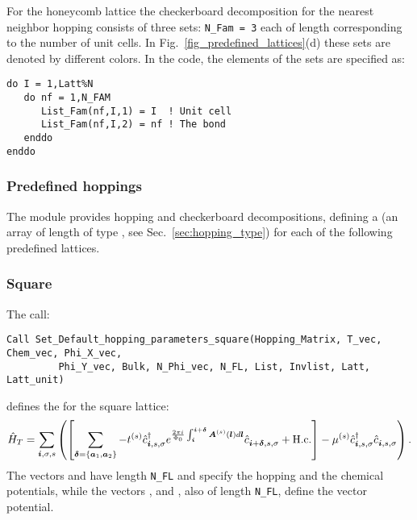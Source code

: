 For the honeycomb lattice  the checkerboard decomposition  for the nearest neighbor hopping consists of three  sets:  \texttt{N\_Fam = 3}  each of length   corresponding  to the number of unit cells.  In  Fig.~\ref{fig_predefined_lattices}(d)  
these sets are denoted by different colors. In the code, the elements of the sets are specified as:

\begin{lstlisting}[style=fortran] 
do I = 1,Latt%N
   do nf = 1,N_FAM
      List_Fam(nf,I,1) = I  ! Unit cell
      List_Fam(nf,I,2) = nf ! The bond 
   enddo
enddo
\end{lstlisting}        


\subsubsection{Predefined hoppings}

The  module provides hopping and checkerboard decompositions, defining a   (an array of length  of type  , see Sec.~\ref{sec:hopping_type}) for each of the following predefined lattices.

\subsubsection*{Square}
The call:
\begin{lstlisting}[style=fortran]
Call Set_Default_hopping_parameters_square(Hopping_Matrix, T_vec, Chem_vec, Phi_X_vec,  
         Phi_Y_vec, Bulk, N_Phi_vec, N_FL, List, Invlist, Latt, Latt_unit)
\end{lstlisting}
defines  the   for the square  lattice: 
\begin{equation}
\hat{H}_T  =   \sum_{\boldsymbol{i}, \sigma, s}  \left( \left[ \sum_{ \boldsymbol{\delta} = \left\{ \boldsymbol{a}_1, \boldsymbol{a}_2\right\} }    - t^{(s)} \hat{c}^{\dagger}_{\boldsymbol{i},s,\sigma}   e^{\frac{2 \pi i}{\Phi_0} \int_{\boldsymbol{i}}^{\boldsymbol{i}+ \boldsymbol{\delta}}  \boldsymbol{A}^{(s)}(\boldsymbol{l})  d \boldsymbol{l}}   \hat{c}^{}_{\boldsymbol{i} + \boldsymbol{\delta},s,\sigma} +  \mathrm{H.c.}   \right]    -  \mu^{(s)} \hat{c}^{\dagger}_{\boldsymbol{i},s,\sigma} \hat{c}^{}_{\boldsymbol{i},s,\sigma}  \right).
\end{equation}
The vectors   and  have  length \texttt{N\_FL} and specify the hopping and the chemical potentials, while the  vectors ,   and ,  also of  length  \texttt{N\_FL},    define the vector potential. 


